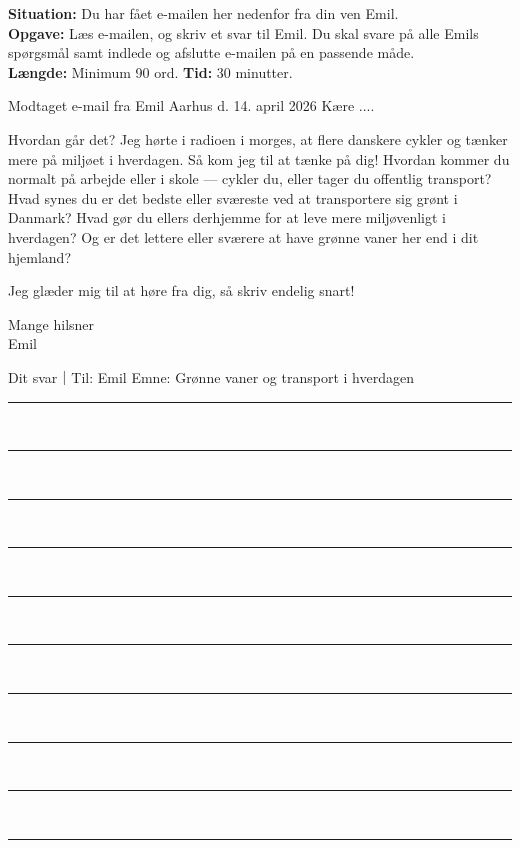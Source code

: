 \textbf{Situation:} Du har fået e-mailen her nedenfor fra din ven Emil.\\
\textbf{Opgave:} Læs e-mailen, og skriv et svar til Emil. Du skal svare på alle Emils spørgsmål samt indlede og afslutte e-mailen på en passende måde.\\
\textbf{Længde:} Minimum 90 ord. \qquad \textbf{Tid:} 30 minutter.

\begin{emailbox}{Modtaget e-mail fra Emil \hfill \small\normalfont Aarhus d. 14. april 2026}
Kære ....

\vspace{0.35em}
Hvordan går det? Jeg hørte i radioen i morges, at flere danskere cykler og tænker mere på miljøet i hverdagen. Så kom jeg til at tænke på dig! Hvordan kommer du normalt på arbejde eller i skole --- cykler du, eller tager du offentlig transport? Hvad synes du er det bedste eller sværeste ved at transportere sig grønt i Danmark? Hvad gør du ellers derhjemme for at leve mere miljøvenligt i hverdagen? Og er det lettere eller sværere at have grønne vaner her end i dit hjemland?

\vspace{0.35em}
Jeg glæder mig til at høre fra dig, så skriv endelig snart!

\vspace{0.35em}
Mange hilsner\\
Emil
\end{emailbox}

\begin{emailbox}{Dit svar｜Til: Emil \qquad Emne: Grønne vaner og transport i hverdagen}
\vspace{0.3em}
\rule{\linewidth}{0.4pt}\\[0.55em]
\rule{\linewidth}{0.4pt}\\[0.55em]
\rule{\linewidth}{0.4pt}\\[0.55em]
\rule{\linewidth}{0.4pt}\\[0.55em]
\rule{\linewidth}{0.4pt}\\[0.55em]
\rule{\linewidth}{0.4pt}\\[0.55em]
\rule{\linewidth}{0.4pt}\\[0.55em]
\rule{\linewidth}{0.4pt}\\[0.55em]
\rule{\linewidth}{0.4pt}\\[0.55em]
\rule{\linewidth}{0.4pt}
\end{emailbox}


